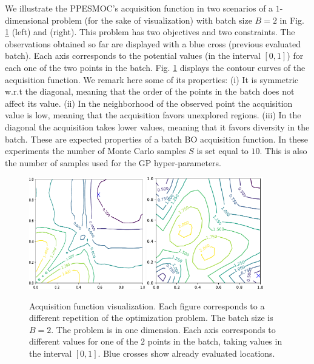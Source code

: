 We illustrate the PPESMOC's acquisition function in two scenarios of a $1$-dimensional problem (for the sake of 
visualization) with batch size $B=2$ in Fig. \ref{fig:ppesmoc} (left) and (right). 
This problem has two objectives and two constraints. The observations obtained so 
far are displayed with a blue cross (previous evaluated batch). Each axis corresponds to 
the potential values (in the interval $[0,1]$) for each one of the two points in the batch. 
Fig. \ref{fig:ppesmoc} displays the contour curves of the acquisition function. 
We remark here some of its properties: (i) It is symmetric w.r.t the diagonal, meaning that the order 
of the points in the batch does not affect its value. (ii) In the neighborhood of the observed 
point the acquisition value is low, meaning that the acquisition favors unexplored regions. 
(iii) In the diagonal the acquisition takes lower values, meaning that it favors diversity in 
the batch. These are expected properties of a batch BO acquisition function.
In these experiments the number of Monte Carlo samples $S$ is set equal to $10$. This is also 
the number of samples used for the GP hyper-parameters.

\begin{figure}[ht]
\begin{center}
\includegraphics[width=0.45\textwidth]{Figures/ppesmoc/2-acq.pdf}
\includegraphics[width=0.45\textwidth]{Figures/ppesmoc/2-acqb.pdf}
\caption{Acquisition function visualization.
Each figure corresponds to a different repetition of the optimization problem. The batch size is $B=2$.
The problem is in one dimension. Each axis corresponds to different values for one
of the $2$ points in the batch, taking values in the interval $[0,1]$. 
Blue crosses show already evaluated locations. }
\label{fig:ppesmoc}
\end{center}
\end{figure}

